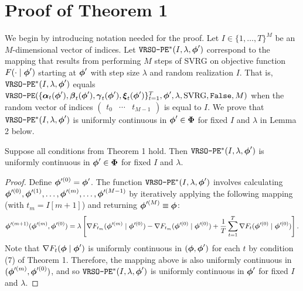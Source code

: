 \section{Proof of Theorem 1}

We begin by introducing notation needed for the proof. Let $I \in \{1,\ldots,T\}^M$ be an $M$-dimensional vector of indices. Let $\texttt{VRSO-PE}^*(I,\lambda,\boldsymbol{\phi}')$ correspond to the mapping that results from performing $M$ steps of SVRG on objective function $F(\cdot \mid \boldsymbol{\phi}')$ starting at $\boldsymbol{\phi}'$ with step size $\lambda$ and random realization $I$. That is, $\texttt{VRSO-PE}^*(I,\lambda,\boldsymbol{\phi}')$ equals $\texttt{VRSO-PE}(\{\boldsymbol{\alpha}_t(\boldsymbol{\phi}'),\boldsymbol{\beta}_t(\boldsymbol{\phi}'),\boldsymbol{\gamma}_t(\boldsymbol{\phi}'),\boldsymbol{\xi}_t(\boldsymbol{\phi}')\}_{t=1}^{T}, \boldsymbol{\phi}', \lambda, \text{SVRG}, \texttt{False}, M)$ when the random vector of indices $\begin{pmatrix} t_0 & \cdots & t_{M-1} \end{pmatrix}$ is equal to $I$. We prove that $\texttt{VRSO-PE}^*(I,\lambda,\boldsymbol{\phi}')$ is uniformly continuous in $\boldsymbol{\phi}' \in \boldsymbol{\Phi}$ for fixed $I$ and $\lambda$ in Lemma 2 below.

\begin{lemma}
    Suppose all conditions from Theorem 1 hold. Then $\texttt{VRSO-PE}^*(I,\lambda,\boldsymbol{\phi}')$ is uniformly continuous in $\boldsymbol{\phi}' \in \boldsymbol{\Phi}$ for fixed $I$ and $\lambda$.
\end{lemma}

\begin{proof}
    Define $\boldsymbol{\phi}'^{(0)} = \boldsymbol{\phi}'$. The function $\texttt{VRSO-PE}^*(I,\lambda,\boldsymbol{\phi}')$ involves calculating $\boldsymbol{\phi}'^{(0)}, \boldsymbol{\phi}'^{(1)}, \ldots, \boldsymbol{\phi}'^{(m)}, \ldots, \boldsymbol{\phi}'^{(M-1)}$ by iteratively applying the following mapping (with $t_m = I[m+1]$) and returning $\boldsymbol{\phi}'^{(M)} \equiv \boldsymbol{\phi}$:
    \begin{equation*}
        \boldsymbol{\phi}'^{(m+1)}(\boldsymbol{\phi}'^{(m)},\boldsymbol{\phi}'^{(0)}) = \lambda \left[\nabla F_{t_m}(\boldsymbol{\phi}'^{(m)} \mid \boldsymbol{\phi}'^{(0)}) - \nabla F_{t_m}(\boldsymbol{\phi}'^{(0)} \mid \boldsymbol{\phi}'^{(0)}) + \frac{1}{T}\sum_{t=1}^T\nabla F_{t}(\boldsymbol{\phi}'^{(0)} \mid \boldsymbol{\phi}'^{(0)}) \right].
    \end{equation*}
    Note that $\nabla F_t(\boldsymbol{\phi} \mid \boldsymbol{\phi}')$ is uniformly continuous in $(\boldsymbol{\phi},\boldsymbol{\phi}')$ for each $t$ by condition (7) of Theorem 1. Therefore, the mapping above is also uniformly continuous in $(\boldsymbol{\phi}'^{(m)},\boldsymbol{\phi}'^{(0)})$, and so $\texttt{VRSO-PE}^*(I,\lambda,\boldsymbol{\phi}')$ is uniformly continuous in $\boldsymbol{\phi}'$ for fixed $I$ and $\lambda$.
\end{proof}

